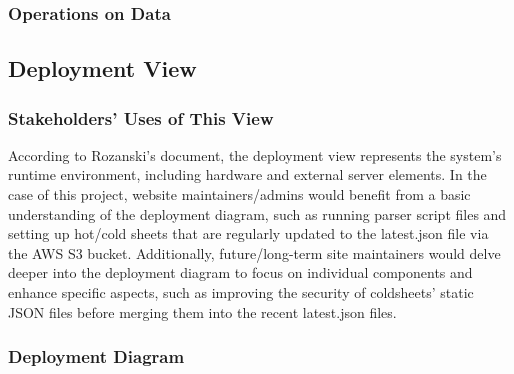 \subsubsection{Operations on Data}

\subsection{Deployment View}

\subsubsection{Stakeholders' Uses of This View}

According to Rozanski's document, the deployment view represents the system's runtime environment, including hardware and external server elements. In the case of this project, website maintainers/admins would benefit from a basic understanding of the deployment diagram, such as running parser script files and setting up hot/cold sheets that are regularly updated to the latest.json file via the AWS S3 bucket. Additionally, future/long-term site maintainers would delve deeper into the deployment diagram to focus on individual components and enhance specific aspects, such as improving the security of coldsheets' static JSON files before merging them into the recent latest.json files.

\subsubsection{Deployment Diagram}

